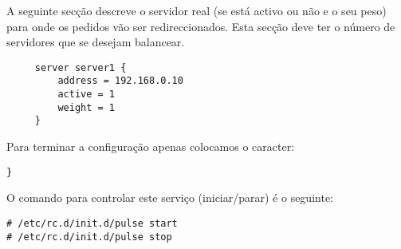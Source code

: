 A seguinte secção descreve o servidor real (se está activo ou não e o seu peso) para onde os pedidos vão ser redireccionados. 
Esta secção deve ter o número de servidores que se desejam balancear.

\begin{verbatim}
     server server1 {
         address = 192.168.0.10
         active = 1
         weight = 1
     }
\end{verbatim}

Para terminar a configuração apenas colocamos o caracter:

\begin{verbatim}
}
\end{verbatim}

O comando para controlar este serviço (iniciar/parar) é o seguinte:

\begin{Verbatim}[commandchars=\\\{\}]
# /etc/rc.d/init.d/pulse start
# /etc/rc.d/init.d/pulse stop
\end{Verbatim}

